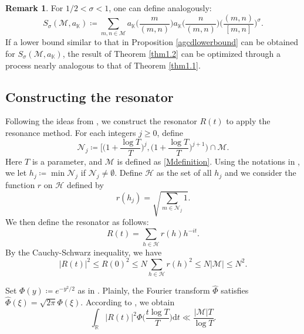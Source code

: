 \documentclass[12pt,reqno]{amsart}
\theoremstyle{definition}
\newtheorem*{xrem}{Remark}
\numberwithin{equation}{section}
\newcommand{\mbk}{\mathbb{K}}
\newcommand{\mbr}{\mathbb{R}}
\newcommand{\mch}{\mathcal{H}}
\newcommand{\mcn}{\mathcal{N}}
\newcommand{\mcm}{\mathcal{M}}
\begin{document}
\begin{xrem}
    For $1/2 < \sigma <1$, one can define analogously:
    \begin{equation}
            \label{SsigmamathcalMa}
        S_{\sigma}(\mcm,a_\mbk) \coloneqq \sum_{m,n\in \mcm} a_\mbk\Big(\frac{m}{(m,n)}\Big)a_\mbk\Big(\frac{n}{(m,n)}\Big)\Big(\frac{(m,n)}{[m,n]}\Big)^{\sigma}.
    \end{equation}
   If a lower bound similar to that in Proposition \ref{agcdlowerbound} can be obtained for $S_{\sigma}(\mcm,a_\mbk)$, the result of Theorem \ref{thm1.2} can be optimized through a process nearly analogous to that of Theorem \ref{thm1.1}.
\end{xrem}

\subsection{Constructing the resonator}
\label{resonator1}
Following the ideas from \cite{aistleitner2016lower,bondarenko2017large,tenen2019galsum,yang2022extreme}, we construct the resonator $R(t)$ to apply the resonance method. For each integers $j \ge 0$, define
$$
\mcn_j\coloneqq\bigg[\Big(1 + \frac{\log T}{T}\Big)^{j}, \Big(1 + \frac{\log T}{T}\Big)^{j + 1}\bigg)\cap\mcm .
$$
Here $T$ is a parameter, and $\mcm$ is defined as \eqref{Mdefinition}. Using the notations in \cite{tenen2019galsum}, we let $h_j \coloneqq \min\mcn_j$ if $\mcn_j \neq \emptyset$. Define $\mch$ as the set of all $h_j$ and we consider the function $r$ on $\mch$ defined by
$$
r(h_{j})=\sqrt{\sum_{m\in\mcn_j}1}.
$$
We then define the resonator as follows:
$$
R(t)=\sum_{h\in\mathcal{H}}r(h)h^{-it}.
$$
By the Cauchy-Schwarz inequality, we have
$$
|R(t)|^2 \le R(0)^{2}\le N\sum_{h\in\mch}r(h)^{2}\le N|\mcm|\le N^{2}.
$$
\par
Set $\Phi(y)\coloneqq e^{-y^{2}/2}$ as in \cite{bondarenko2017large}. Plainly, the Fourier transform $\widehat{\Phi}$ satisfies $\widehat{\Phi}(\xi)=\sqrt{2\pi}\Phi(\xi)$. According to \cite[Lemma 5]{bondarenko2018argument}, we obtain
\begin{equation}
\label{trivialboundrphi}
\int_\mbr |R(t)|^{2}\Phi\Big(\frac{t\log T}{T}\Big)\mathrm{d}t\ll\frac{|\mcm|T}{\log T}.
\end{equation} 
\end{document}
